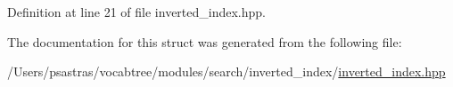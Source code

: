 Definition at line 21 of file inverted\-\_\-index.\-hpp.



The documentation for this struct was generated from the following file\-:\begin{DoxyCompactItemize}
\item 
/\-Users/psastras/vocabtree/modules/search/inverted\-\_\-index/\hyperlink{inverted__index_8hpp}{inverted\-\_\-index.\-hpp}\end{DoxyCompactItemize}
